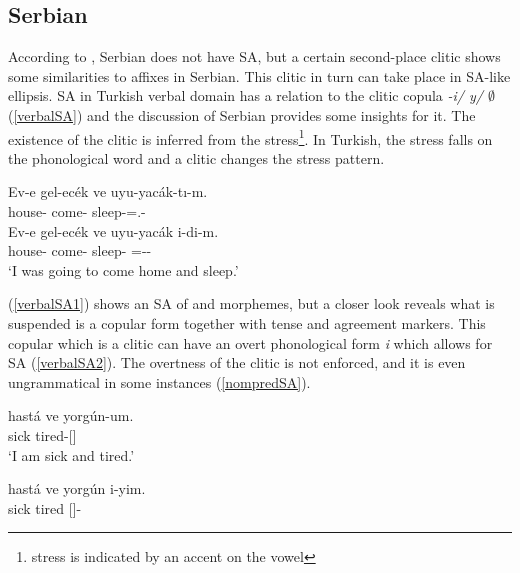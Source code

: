 \subsection{Serbian}

According to \citet{despic2017suspended}, Serbian does not have SA, but a certain second-place clitic shows some similarities to affixes in Serbian. This clitic in turn can take place in SA-like ellipsis. SA in Turkish verbal domain has a relation to the clitic copula \textit{-i/ y/ $\emptyset$} (\ref{verbalSA}) and the discussion of Serbian provides some insights for it. The existence of the clitic is inferred from the stress\footnote{stress is indicated by an accent on the vowel}. In Turkish, the stress falls on the phonological word and a clitic changes the stress pattern.

\begin{exe}
    \ex \label{verbalSA}
    \begin{xlist}
        \ex \label{verbalSA1}
        \gll Ev-e gel-ec\'{e}k ve uyu-yac\'{a}k-tı-m. \\ 
        house-{\Dat} come-{\Fut} {\And} sleep-{\Fut}={\Cop}.{\Pst}-{\Fsg} \\
        
        \ex \label{verbalSA2}
        \gll Ev-e gel-ec\'{e}k ve uyu-yac\'{a}k i-di-m. \\ 
        house-{\Dat} come-{\Fut} {\And} sleep-{\Fut} ={\Cop}-{\Pst}-{\Fsg} \\
        \glt `I was going to come home and sleep.'
    \end{xlist}
\end{exe}

(\ref{verbalSA1}) shows an SA of {\Pst} and {\Agr} morphemes, but a closer look reveals what is suspended is a copular form together with tense and agreement markers. This copular which is a clitic can have an overt phonological form \textit{i} which allows for SA (\ref{verbalSA2}). The overtness of the clitic is not enforced, and it is even ungrammatical in some instances (\ref{nompredSA}). 

\begin{exe}
    \ex \label{nompredSA}
    \begin{xlist}
        \ex \gll hast\'{a} ve yorg\'{u}n-um. \\
        sick {\And} tired-{\Fsg}[{\Prs}] \\
        \glt `I am sick and tired.'
        
        \ex \gll *hast\'{a} ve yorg\'{u}n i-yim. \\ 
        sick {\And} tired {\Cop}[{\Prs}]-{\Fsg} \\
    \end{xlist}
\end{exe}

